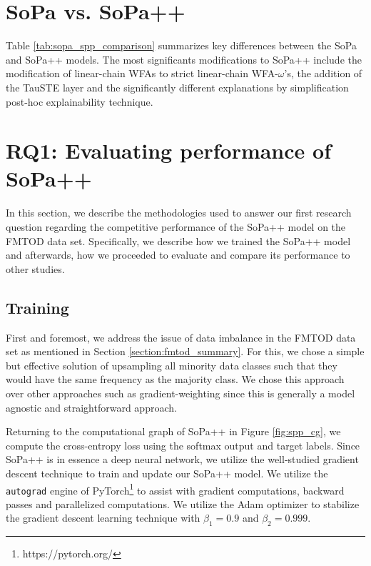 \section{SoPa vs. SoPa++}

Table \ref{tab:sopa_spp_comparison} summarizes key differences between the SoPa
and SoPa++ models. The most significants modifications to SoPa++ include the
modification of linear-chain WFAs to strict linear-chain WFA-$\omega$'s, the
addition of the TauSTE layer and the significantly different explanations by
simplification post-hoc explainability technique.

\section{RQ1: Evaluating performance of SoPa++}

In this section, we describe the methodologies used to answer our first research
question regarding the competitive performance of the SoPa++ model on the FMTOD
data set. Specifically, we describe how we trained the SoPa++ model and
afterwards, how we proceeded to evaluate and compare its performance to other
studies.

\subsection{Training}

First and foremost, we address the issue of data imbalance in the FMTOD data set
as mentioned in Section \ref{section:fmtod_summary}. For this, we chose a simple
but effective solution of upsampling all minority data classes such that they
would have the same frequency as the majority class. We chose this approach over
other approaches such as gradient-weighting since this is generally a model
agnostic and straightforward approach.

Returning to the computational graph of SoPa++ in Figure \ref{fig:spp_cg}, we
compute the cross-entropy loss using the softmax output and target labels. Since
SoPa++ is in essence a deep neural network, we utilize the well-studied gradient
descent technique to train and update our SoPa++ model. We utilize the
\texttt{autograd} engine of PyTorch\footnote{https://pytorch.org/} to assist
with gradient computations, backward passes and parallelized computations. We
utilize the Adam optimizer \citep{DBLP:journals/corr/KingmaB14} to stabilize the
gradient descent learning technique with $\beta_1=0.9$ and $\beta_2=0.999$.

